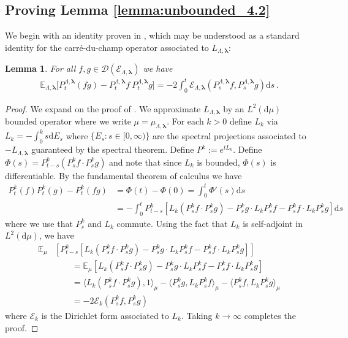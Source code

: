 \documentclass[10pt]{amsart}
\newtheorem{lemma}[theorem]{Lemma}
\theoremstyle{definition}
\theoremstyle{remark}
\newcommand{\dirichlet}{\mathcal{E}}
\newcommand{\blambda}{{\boldsymbol{\lambda}}}
\newcommand{\E}{\mathbb{E}}
\newcommand{\region}{\Lambda}
\newcommand{\activities}{\pmb{\lambda}}
\newcommand{\diff}{\mathrm{d}}
\newcommand{\domain}{\mathcal{D}}
\begin{document}
	
	
	\subsection{Proving Lemma \texorpdfstring{\ref{lemma:unbounded_4.2}}{3.4}}
	
	
	We begin with an identity proven in \cite[Eq.~(4.3)]{bertini2002spectral}, which may be understood as a standard identity for the carr\'e-du-champ operator associated to $L_{\Lambda,\blambda}$:
	
	\begin{lemma}\label{lem:dirichlet-form-curvature}
		For all $f,g \in \domain(\dirichlet_{\Lambda,\blambda})$ we have \begin{align*}
			\E_{\region, \activities}\big[P_t^{\region, \activities}(f  g) - P_t^{\region, \activities}f \ P_t^{\region, \activities}g\big] = -2 \int_0^t \dirichlet_{\region, \activities}(P_s^{\region, \activities}f,P_s^{\region, \activities}g) \diff s\,.
		\end{align*}
	\end{lemma}
	\begin{proof}
		We expand on the proof of \cite[Eq.~(4.3)]{bertini2002spectral}.  We approximate $L_{\Lambda,\blambda}$ by an $L^2(\diff \mu)$ bounded operator where we write $\mu = \mu_{\Lambda,\blambda}$.  For each $k > 0$ define $L_k$ via $L_k = - \int_0^k s \diff E_s$ where $\{E_s : s \in [0,\infty)\}$ are the spectral projections associated to $-L_{\Lambda,\blambda}$ guaranteed by the spectral theorem.  Define $P^{k}:= e^{t L_k}$.  Define $\Phi(s) = P^k_{t -s}(P_s^k f \cdot P_s^k g)$ and note that since $L_k$ is bounded, $\Phi(s)$ is differentiable.  By the fundamental theorem of calculus we have \begin{align*}
			P_t^k(f) P_t^k(g) - P_t^k(fg) &=  \Phi(t) - \Phi(0) = \int_0^t \Phi'(s)\diff s \\ 
			&= -\int_0^t P_{t - s}^k\left[ L_k (P_s^k f \cdot P_s^k g) - P_s^k g \cdot L_k P_s^k f - P_s^k f \cdot  L_k  P_s^k g \right]\diff s
		\end{align*}
		where we use that $P_s^k$ and $L_k$ commute. Using the fact that $L_k$ is self-adjoint in $L^2(\diff \mu)$, we have \begin{align*}
			\E_\mu&\left[P_{t - s}^k\left[ L_k (P_s^k f \cdot P_s^k g) - P_s^k g \cdot L_k P_s^k f - P_s^k f \cdot  L_k  P_s^k g \right] \right] \\
			&\qquad=  \E_\mu\left[ L_k (P_s^k f \cdot P_s^k g) - P_s^k g \cdot L_k P_s^k f - P_s^k f \cdot  L_k  P_s^k g  \right] \\
			&\qquad= \langle L_k (P_s^k f \cdot P_s^k g), 1\rangle_\mu - \langle P_s^k g, L_kP_s^k f\rangle_\mu - \langle P_s^k f, L_k P_s^k g\rangle_\mu \\
			&\qquad= -2 \mathcal{E}_k(P_s^k f, P_s^k g)
		\end{align*}
		where $\mathcal{E}_k$ is the Dirichlet form associated to $L_k$.  Taking $k \to \infty$ completes the proof.
	\end{proof}
	
\end{document}
